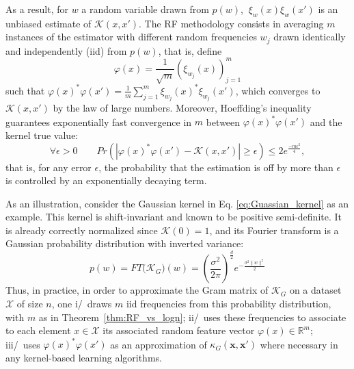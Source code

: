 As a result, for $w$ a random variable drawn from $p(w)$, $\ \xi_w(x)\xi_w(x')$ is an unbiased estimate of $\mathcal{K}(x,x')$. The RF methodology consists in averaging $m$ instances of the estimator with different random frequencies $w_j$ drawn identically and independently (iid) from $p(w)$, that is, define
\[
\varphi(x) = \frac{1}{\sqrt{m}} ( \xi_{w_j}(x) )_{j=1}^m
\]
such that $\varphi(x)^*\varphi(x')=\frac{1}{m} \sum_{j=1}^m \xi_{w_j}(x)^*\xi_{w_j}(x')$, which converges to $\mathcal{K}(x,x')$ by the law of large numbers. Moreover, Hoeffding's inequality guarantees exponentially fast convergence in $m$ between $\varphi(x)^*\varphi(x')$ and the kernel true value:
\begin{equation}
   \forall \epsilon >0\qquad Pr(|\varphi(x)^*\varphi(x')-\mathcal{K}(x,x')|\geq\epsilon)\leq2e^\frac{-m\epsilon^2}{4},
\end{equation}
that is, for any error $\epsilon$, the probability that the estimation is off by more than $\epsilon$ is controlled by an exponentially decaying term.


As an illustration, consider the Gaussian kernel in Eq. \ref{eq:Guassian_kernel} as an example. This kernel is shift-invariant and known to be positive semi-definite. It is already correctly normalized since $\mathcal{K}(0) = 1$, and its Fourier transform is a Gaussian probability distribution with inverted variance:
\[p(w)=FT\big(\mathcal{K}_G\big)(w)=\left(\frac{\sigma^2}{2\pi}\right)^\frac{d}{2}e^{-\frac{\sigma^2\|w\|^2}{2}}\]
Thus, in practice, in order to approximate the Gram matrix of $\mathcal{K}_G$ on a dataset $\mathcal{X}$ of size $n$, one i/~draws $m$ iid frequencies from this probability distribution, with $m$ as in Theorem~\ref{thm:RF_vs_logn}; ii/~uses these frequencies to associate to each element $x\in\mathcal{X}$ its associated random feature vector $\varphi(x)\in\mathbb{R}^m$; iii/~uses $\varphi(x)^*\varphi(x')$ as an approximation of $\kappa_G(\mathbf{x},\mathbf{x}')$ where necessary in any kernel-based learning algorithms.

